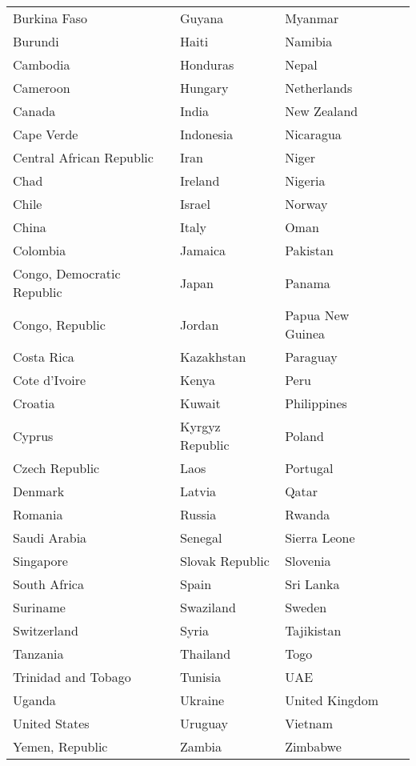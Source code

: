 \begin{apendicesenv}
\begin{table}[H]
\begin{tabularx}{\textwidth}{l*{3}{>{\raggedright\arraybackslash}X}}
        Burkina Faso & Guyana & Myanmar \\
        Burundi & Haiti & Namibia \\
        Cambodia & Honduras & Nepal \\
        Cameroon & Hungary & Netherlands \\
        Canada & India & New Zealand \\
        Cape Verde & Indonesia & Nicaragua \\
        Central African Republic & Iran & Niger \\
        Chad & Ireland & Nigeria \\
        Chile & Israel & Norway \\
        China & Italy & Oman \\
        Colombia & Jamaica & Pakistan \\
        Congo, Democratic Republic & Japan & Panama \\
        Congo, Republic & Jordan & Papua New Guinea \\
        Costa Rica & Kazakhstan & Paraguay \\
        Cote d'Ivoire & Kenya & Peru \\
        Croatia & Kuwait & Philippines \\
        Cyprus & Kyrgyz Republic & Poland \\
        Czech Republic & Laos & Portugal \\
        Denmark & Latvia & Qatar \\
        Romania & Russia & Rwanda \\
        Saudi Arabia & Senegal & Sierra Leone \\
        Singapore & Slovak Republic & Slovenia \\
        South Africa & Spain & Sri Lanka \\
        Suriname & Swaziland & Sweden \\
        Switzerland & Syria & Tajikistan \\
        Tanzania & Thailand & Togo \\
        Trinidad and Tobago & Tunisia & UAE \\
        Uganda & Ukraine & United Kingdom \\
        United States & Uruguay & Vietnam \\
        Yemen, Republic & Zambia & Zimbabwe \\
        \bottomrule
    \end{tabularx}
\end{table}

\end{apendicesenv}
